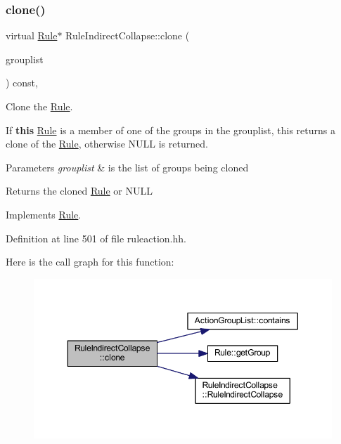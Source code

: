 \subsubsection{\texorpdfstring{clone()}{clone()}}
{\footnotesize\ttfamily virtual \mbox{\hyperlink{class_rule}{Rule}}$\ast$ Rule\+Indirect\+Collapse\+::clone (\begin{DoxyParamCaption}\item[{const \mbox{\hyperlink{class_action_group_list}{Action\+Group\+List}} \&}]{grouplist }\end{DoxyParamCaption}) const\hspace{0.3cm}{\ttfamily [inline]}, {\ttfamily [virtual]}}



Clone the \mbox{\hyperlink{class_rule}{Rule}}. 

If {\bfseries{this}} \mbox{\hyperlink{class_rule}{Rule}} is a member of one of the groups in the grouplist, this returns a clone of the \mbox{\hyperlink{class_rule}{Rule}}, otherwise N\+U\+LL is returned. 
\begin{DoxyParams}{Parameters}
{\em grouplist} & is the list of groups being cloned \\
\hline
\end{DoxyParams}
\begin{DoxyReturn}{Returns}
the cloned \mbox{\hyperlink{class_rule}{Rule}} or N\+U\+LL 
\end{DoxyReturn}


Implements \mbox{\hyperlink{class_rule_a70de90a76461bfa7ea0b575ce3c11e4d}{Rule}}.



Definition at line 501 of file ruleaction.\+hh.

Here is the call graph for this function\+:
\nopagebreak
\begin{figure}[H]
\begin{center}
\leavevmode
\includegraphics[width=350pt]{class_rule_indirect_collapse_aef29a6d2a3b44941b7c8b98eafef59aa_cgraph}
\end{center}
\end{figure}
\mbox{\label{class_rule_indirect_collapse_a8aec34ef85573539eb601cc19ab34860}} 
